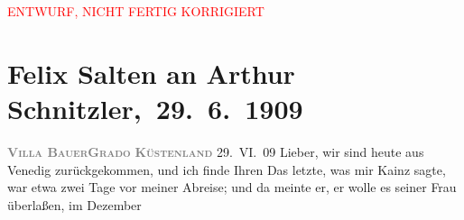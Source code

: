 
\begin{center}
            \textcolor{red}{ENTWURF, NICHT FERTIG KORRIGIERT}
                      \end{center}
            
         
         \renewcommand{\erwaehntePersonen}{Personen: Josef Kainz, Margarethe Kainz, Anna Katharina Rehmann, Paul Salten, Olga Schnitzler, Heinrich Schnitzler}
         \renewcommand{\erwaehnteInstitutionen}{Institutionen: Burgtheater}
         \renewcommand{\erwaehnteOrte}{Orte: Grado, Lido, Venedig, Villa Bauer, Wien}
         \renewcommand{\erwaehnteWerke}{Werke: Der neue Vertrag Josef Kainz’, Neue Freie Presse}
               \section[ Felix Salten an Arthur Schnitzler, 29. 6. 1909]{ Felix Salten an Arthur Schnitzler, 29. 6. 1909}\nopagebreak{}\rehead{ }\begin{ledgroupsized}[t]{13cm}\normalsize\beginnumbering \toendnotes[C]{\smallbreak\pagebreak[2]} 
\toendnotes[C]{\smallbreak}\pstart
           \noindent{}{\pb}\textcolor{gray}{\textbf{\textsc{Villa Bauer}}}\hfill \textcolor{gray}{\textbf{\textsc{Grado}}}\pend
           \pstart
           \raggedleft{}\textcolor{gray}{\textbf{\textsc{Küstenland}}}\pend
           \pstart
           \raggedleft{}29. VI. 09\pend
           \pstart{}Lieber,\pend\pstart
           wir sind heute aus Venedig zurückgekommen, und ich finde Ihren \label{K_L03501-1v}\label{K_L03501-1h} Das letzte, was
               mir Kainz sagte, war etwa zwei Tage vor meiner
               Abreise; und da meinte er, er wolle es seiner Frau überlaßen, im Dezember

\end{ledgroupsized}
